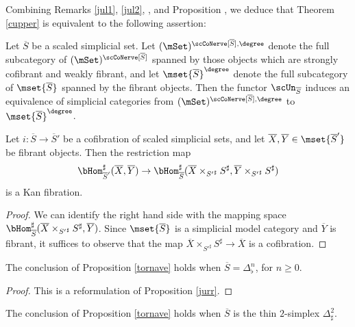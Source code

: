 Combining Remarks \ref{jul1}, \ref{jul2}, , and Proposition
, we deduce that Theorem \ref{cupper} is equivalent to the following assertion:

\begin{proposition}\label{tornave}
Let $\overline{S}$ be a scaled simplicial set.
Let $(\mSet)^{\scCoNerve[ \overline{S}], \degree}$ denote the full subcategory
of $(\mSet)^{\scCoNerve[ \overline{S}] }$ spanned by those objects which
are strongly cofibrant and weakly fibrant, and let $\mset{ \overline{S} }^{\degree}$ denote the full subcategory of $\mset{ \overline{S} }$ spanned by the fibrant objects. Then
the functor $\scUn_{\overline{S}}$ induces an equivalence of simplicial categories
from $(\mSet)^{\scCoNerve[ \overline{S}], \degree}$ to $\mset{\overline{S}}^{\degree}$.
\end{proposition}

\begin{lemma}\label{gutta}
Let $i: \overline{S} \rightarrow \overline{S}'$ be a cofibration of scaled simplicial sets,
and let $\overline{X}, \overline{Y} \in \mset{ \overline{S}' }$ be fibrant objects. Then the restriction map
$$ \bHom^{\sharp}_{ \overline{S}' }( \overline{X}, \overline{Y} )
\rightarrow \bHom^{\sharp}_{ \overline{S} }( \overline{X} \times_{ {S'}^{\sharp}}
S^{\sharp}, \overline{Y} \times_{ { S'}^{\sharp} } S^{\sharp} )$$
is a Kan fibration.
\end{lemma}

\begin{proof}
We can identify the right hand side with the mapping space
$\bHom^{\sharp}_{ \overline{S} }( \overline{X} \times_{ {S'}^{\sharp} } S^{\sharp},
\overline{Y} )$. Since $\mset{ \overline{S} }$ is a simplicial model category and
$\overline{Y}$ is fibrant, it suffices to observe that the map
$\overline{X} \times_{ {S'}^{\sharp} } S^{\sharp} \rightarrow \overline{X}$ is a cofibration.
\end{proof}

\begin{lemma}\label{cuppa}
The conclusion of Proposition \ref{tornave} holds when $\overline{S} = \Delta^n_{\flat}$, for $n \geq 0$.
\end{lemma}

\begin{proof}
This is a reformulation of Proposition \ref{jurr}.
\end{proof}

\begin{lemma}\label{culpa}
The conclusion of Proposition \ref{tornave} holds when $\overline{S}$ is the thin
$2$-simplex $\Delta^2_{\sharp}$.
\end{lemma}

